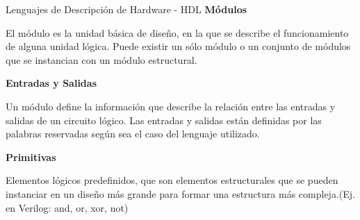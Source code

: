 \documentclass[11pt]{beamer}
\begin{document}
	
	\begin{frame}{Lenguajes de Descripción de Hardware - HDL}
		\textbf{Módulos} 
		
		El módulo es la unidad básica de diseño, en la que se describe el funcionamiento de alguna unidad lógica. Puede existir un sólo módulo o un conjunto de módulos que se instancian con un módulo estructural.\newline
		
		
		\textbf{Entradas y Salidas} 
		
		Un módulo define la información que describe la relación entre las entradas y salidas de un circuito lógico. Las entradas y salidas están definidas por las palabras reservadas según sea el caso del lenguaje utilizado.\newline
		
		\textbf{Primitivas} 
		
		Elementos lógicos predefinidos, que son elementos estructurales que se pueden instanciar en un diseño más grande para formar una estructura más compleja.(Ej. en Verilog: and, or, xor, not)
		
		
		
	\end{frame}
	
\end{document}
